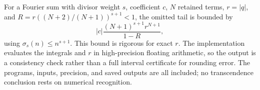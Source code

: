 For a Fourier sum with divisor weight $s$, coefficient $c$, $N$ retained terms, $r=|q|$, and $R=r((N+2)/(N+1))^{s+1}<1$, the omitted tail is bounded by
\[
 |c|\frac{(N+1)^{s+1}r^{N+1}}{1-R},
\]
using $\sigma_s(n)\le n^{s+1}$. This bound is rigorous for exact $r$. The implementation evaluates the integrals and $r$ in high-precision floating arithmetic, so the output is a consistency check rather than a full interval certificate for rounding error. The programs, inputs, precision, and saved outputs are all included; no transcendence conclusion rests on numerical recognition.
